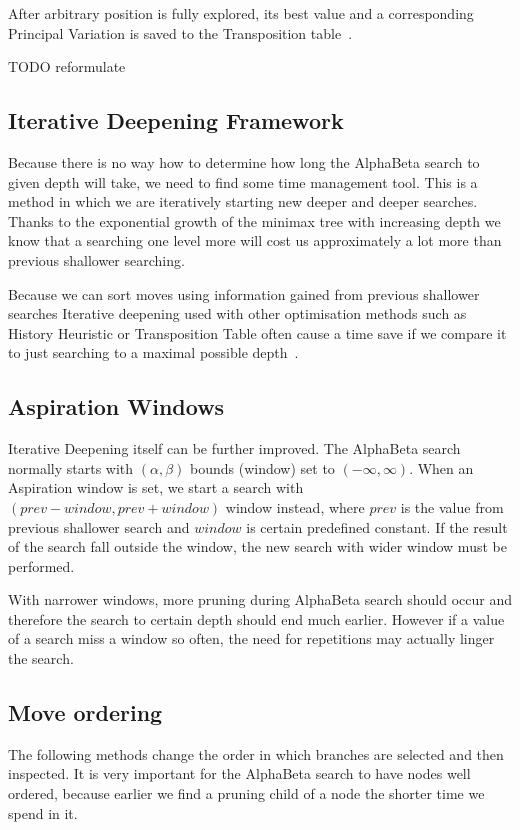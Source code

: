 After arbitrary position is fully explored, its best value and a corresponding
Principal Variation is saved to the Transposition table~\cite{COX}.

TODO reformulate

\subsection{Iterative Deepening Framework}
Because there is no way how to determine how long the AlphaBeta search to
given depth will take, we need to find some time management tool. This is a
method in which we are iteratively starting new deeper and deeper searches.
Thanks to the exponential growth of the minimax tree with increasing depth we
know that a searching one level more will cost us approximately a lot more than
previous shallower searching.

Because we can sort moves using information gained from previous shallower
searches Iterative deepening used with other optimisation methods such as
History Heuristic or Transposition Table often cause a time save if we compare
it to just searching to a maximal possible depth~\cite{COX}.

\subsection{Aspiration Windows}
Iterative Deepening itself can be further improved. The AlphaBeta search
normally starts with $(\alpha,\beta)$ bounds (window) set to
$(-\infty,\infty)$. When an Aspiration window is set, we start a search with
$(prev - window, prev + window)$ window instead, where $prev$ is the value from
previous shallower search and $window$ is certain predefined constant. If the
result of the search fall outside the window, the new search with wider window
must be performed.

With narrower windows, more pruning during AlphaBeta search should occur and
therefore the search to certain depth should end much earlier. However if a
value of a search miss a window so often, the need for repetitions may actually
linger the search\cite{AspirationWindow}.


\subsection{Move ordering}
The following methods change the order in which branches are selected and then
inspected. It is very important for the AlphaBeta search to have nodes well
ordered, because earlier we find a pruning child of a node the shorter time
we spend in it.

